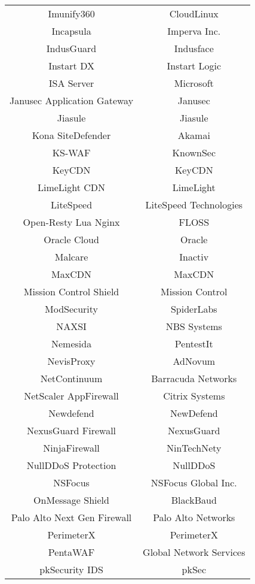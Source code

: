 \begin{table}[h]
\begin{tabular}{|c | c |}
      Imunify360 & CloudLinux\\
      Incapsula & Imperva Inc.\\
      IndusGuard & Indusface\\
      Instart DX & Instart Logic\\
      ISA Server & Microsoft\\
      Janusec Application Gateway & Janusec\\
      Jiasule & Jiasule\\
      Kona SiteDefender & Akamai\\
      KS-WAF & KnownSec\\
      KeyCDN & KeyCDN\\
      LimeLight CDN & LimeLight\\
      LiteSpeed & LiteSpeed Technologies\\
      Open-Resty Lua Nginx & FLOSS\\
      Oracle Cloud & Oracle\\
      Malcare & Inactiv\\
      MaxCDN & MaxCDN\\
      Mission Control Shield & Mission Control\\
      ModSecurity & SpiderLabs\\
      NAXSI & NBS Systems\\
      Nemesida & PentestIt\\
      NevisProxy & AdNovum\\
      NetContinuum & Barracuda Networks\\
  NetScaler AppFirewall           & Citrix Systems\\
  Newdefend                       & NewDefend\\
  NexusGuard Firewall             & NexusGuard\\
  NinjaFirewall                   & NinTechNety\\
  NullDDoS Protection             & NullDDoS\\
  NSFocus                         & NSFocus Global Inc.\\
  OnMessage Shield                & BlackBaud\\
  Palo Alto Next Gen Firewall     & Palo Alto Networks\\
  PerimeterX                      & PerimeterX\\
  PentaWAF                        & Global Network Services\\
  pkSecurity IDS                  & pkSec\\

\end{tabular}
\end{table}
